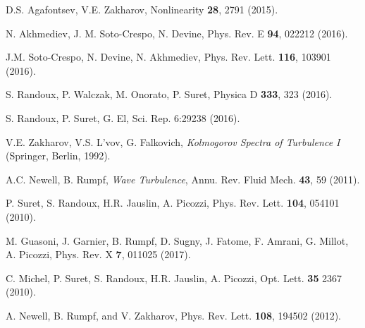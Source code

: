 \documentclass[pra,twocolumn,showpacs,preprintnumbers,amsmath,amssymb]{revtex4}
\begin{document}
\begin{thebibliography}{99}
D.S. Agafontsev, V.E. Zakharov,
Nonlinearity {\bf 28}, 2791 (2015).


N. Akhmediev, J. M. Soto-Crespo, N. Devine,
Phys. Rev. E {\bf 94}, 022212 (2016).

J.M. Soto-Crespo, N. Devine, N. Akhmediev,
Phys. Rev. Lett. {\bf 116}, 103901 (2016).


S. Randoux, P. Walczak, M. Onorato, P. Suret, 
Physica D {\bf 333}, 323 (2016).

S. Randoux, P. Suret, G. El,
Sci. Rep. 6:29238 (2016).


V.E. Zakharov, V.S. L'vov, G. Falkovich, {\it Kolmogorov Spectra of Turbulence I} (Springer, Berlin, 1992).


A.C. Newell, B. Rumpf, 
{\it Wave Turbulence},
Annu. Rev. Fluid Mech. {\bf 43}, 59 (2011).


P. Suret, S. Randoux, H.R. Jauslin, A. Picozzi,
Phys. Rev. Lett. {\bf 104}, 054101 (2010).


M. Guasoni, J. Garnier, B. Rumpf, D. Sugny, J. Fatome, F. Amrani, G. Millot, A. Picozzi,
Phys. Rev. X {\bf 7}, 011025 (2017).


C. Michel, P. Suret, S. Randoux, H.R. Jauslin, A. Picozzi,
Opt. Lett. {\bf 35} 2367 (2010).


A. Newell, B. Rumpf, and V. Zakharov, 
Phys. Rev. Lett. {\bf 108}, 194502 (2012).


\end{thebibliography}
\end{document}
